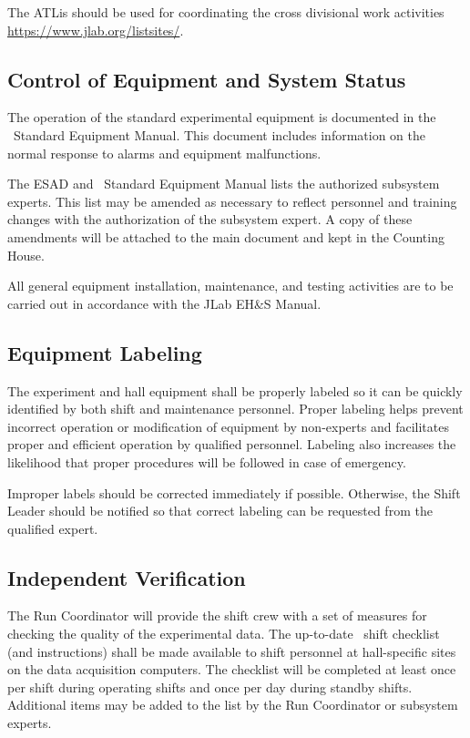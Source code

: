 \documentclass[10pt]{article}
\begin{document}
The ATLis should be used for coordinating the cross divisional work activities
\url{https://www.jlab.org/listsites/}.

\subsection{Control of Equipment and System Status}
The operation of the standard experimental equipment is documented in the
\HALL\ Standard Equipment Manual.
This document includes information on the
normal response to alarms and equipment malfunctions.

The ESAD and \HALL\ Standard Equipment Manual lists
the authorized subsystem experts. This list may be amended as necessary to
reflect personnel and training changes with the
authorization of the subsystem expert. A copy of these
amendments will be attached to the main document and kept in the
Counting House.

All general equipment installation, maintenance, and testing activities
are to be carried out in accordance with the JLab EH\&S Manual.

\subsection{Equipment Labeling}
The experiment and hall equipment shall be properly labeled so
it can be quickly identified by both shift and maintenance personnel.
Proper labeling helps prevent incorrect operation or modification of
equipment by non-experts and facilitates proper and efficient operation by
qualified personnel. Labeling also increases the likelihood that
proper procedures will be followed in case of emergency.

Improper labels should be corrected immediately if possible.
Otherwise, the Shift Leader should be notified so that correct
labeling can be requested from the qualified expert.


\subsection{Independent Verification}

The Run Coordinator will provide the shift crew with a set of
measures for checking the quality of the experimental data.
The up-to-date \HALL\ shift
checklist (and instructions) shall be made available to shift personnel
at hall-specific sites on the data acquisition  computers.
The checklist will be completed at least once per shift during operating
shifts and once per day during standby shifts. Additional items may be
added to the list by the Run Coordinator or subsystem experts.
\end{document}
